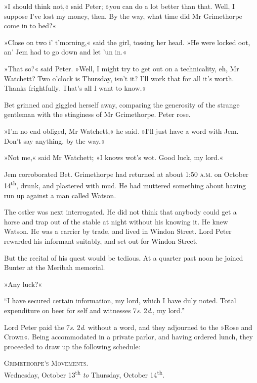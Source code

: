 »I should think not,« said Peter; »you can do a lot better than that. Well, I suppose I've lost my money, then. By the way, what time did Mr Grimethorpe come in to bed?«

»Close on two i' t'morning,« said the girl, tossing her head. »He were locked oot, an' Jem had to go down and let 'un in.«

»That so?« said Peter. »Well, I might try to get out on a technicality, eh, Mr Watchett? Two o'clock is Thursday, isn't it? I'll work that for all it's worth. Thanks frightfully. That's all I want to know.«

Bet grinned and giggled herself away, comparing the generosity of the strange gentleman with the stinginess of Mr Grimethorpe. Peter rose.

»I'm no end obliged, Mr Watchett,« he said. »I'll just have a word with Jem. Don't say anything, by the way.«

»Not me,« said Mr Watchett; »I knows wot's wot. Good luck, my lord.«

Jem corroborated Bet. Grimethorpe had returned at about 1:50 \textsc{a.m.} on October 14\textsuperscript{th}, drunk, and plastered with mud. He had muttered something about having run up against a man called Watson.

The ostler was next interrogated. He did not think that anybody could get a horse and trap out of the stable at night without his knowing it. He knew Watson. He was a carrier by trade, and lived in Windon Street. Lord Peter rewarded his informant suitably, and set out for Windon Street.

But the recital of his quest would be tedious. At a quarter past noon he joined Bunter at the Meribah memorial.

»Any luck?«

\enquote{I have secured certain information, my lord, which I have duly noted. Total expenditure on beer for self and witnesses 7\textit{s}. 2\textit{d}., my lord.}

Lord Peter paid the 7\textit{s}. 2\textit{d}. without a word, and they adjourned to the »Rose and Crown«. Being accommodated in a private parlor, and having ordered lunch, they proceeded to draw up the following schedule:

\begin{center}
\textsc{Grimethorpe's Movements.}\\Wednesday, October 13\textsuperscript{th} \textit{to} Thursday, October 14\textsuperscript{th}.
\end{center}


